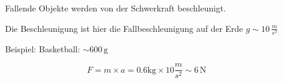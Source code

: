 \documentclass{beamer}
\begin{document}
\begin{frame}
\begin{columns}[c]
\begin{column}{2cm}
\end{column}



\begin{column}{8cm}
Fallende Objekte werden von der Schwerkraft beschleunigt. 

Die Beschleunigung ist hier die Fallbeschleunigung auf der Erde \(g \sim 10\,\frac{m}{s^2}\) \\[0.5 cm]

\pause

Beispiel: Basketball: \(\sim 600\,\text{g}\)

 
\pause

\[F = m\times a = 0.6\text{kg} \times 10 \frac{m}{s^2} \sim 6\,\text{N}\]

\end{column}





\end{columns}


\end{frame}




\begin{frame}
\end{frame}





\end{document}
